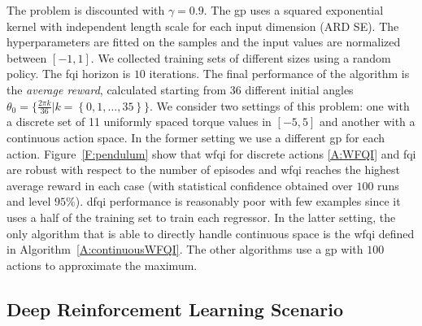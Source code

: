 The problem is discounted with $\gamma = 0.9$.
The \gls{gp} uses a squared exponential kernel with independent length scale for each input dimension (ARD SE). The hyperparameters are fitted on the samples and the input values are normalized between $[-1,1]$.
We collected training sets of different sizes using a random policy.
The \gls{fqi} horizon is $10$ iterations.
The final performance of the algorithm is the \emph{average reward}, calculated starting from $36$ different initial angles $\theta_0 = \lbrace \frac{2\pi k}{36} | k=\left\{0, 1, \ldots, 35\right\}\rbrace$.
We consider two settings of this problem: one with a discrete set of 11 uniformly spaced torque values in $[-5,5]$ and another with a continuous action space.
In the former setting we use a different \gls{gp} for each action.
Figure~\ref{F:pendulum} show that \gls{wfqi} for discrete actions \ref{A:WFQI} and \gls{fqi} are robust with respect to the number of episodes and \gls{wfqi} reaches the highest average reward in each case (with statistical confidence obtained over $100$ runs and level $95\%$).
\gls{dfqi} performance is reasonably poor with few examples since it uses a half of the training set to train each regressor.
In the latter setting, the only algorithm that is able to directly handle continuous space is the \gls{wfqi} defined in Algorithm~\ref{A:continuousWFQI}.
The other algorithms use a \gls{gp} with $100$ actions to approximate the maximum.

\subsection{Deep Reinforcement Learning Scenario}
